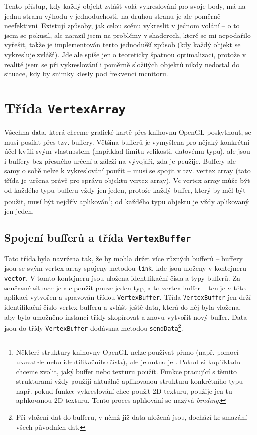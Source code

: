 \documentclass[a4paper, 11pt]{report}
\begin{document}
Tento přístup, kdy každý objekt zvlášť volá vykreslování pro svoje body, má na jednu stranu výhodu v jednoduchosti, na druhou stranu je ale poměrně neefektivní. Existují způsoby, jak celou scénu vykreslit v jednom volání -- o to jsem se pokusil, ale narazil jsem na problémy v shaderech, které se mi nepodařilo vyřešit, takže je implementován tento jednodušší způsob (kdy každý objekt se vykresluje zvlášť). Jde ale spíše jen o teoreticky špatnou optimalizaci, protože v realitě jsem se při vykreslování i poměrně složitých objektů nikdy nedostal do situace, kdy by snímky klesly pod frekvenci monitoru.

\section{Třída \texttt{VertexArray}}
Všechna data, která chceme grafické kartě přes knihovnu OpenGL poskytnout, se musí posílat přes tzv. buffery. Většina bufferů je vymyšlena pro nějaký konkrétní účel kvůli svým vlastnostem (například limitu velikosti, datovému typu), ale jsou i buffery bez přesného určení a záleží na vývojáři, zda je použije. Buffery ale samy o sobě nelze k vykreslování použít -- musí se spojit v tzv. vertex array (tato třída je určena právě pro správu objektu vertex array). Ve vertex array může být od každého typu bufferu vždy jen jeden, protože každý buffer, který by měl být použit, musí být nejdřív aplikován\footnote{Některé struktury knihovny OpenGL nelze používat přímo (např. pomocí ukazatele nebo identifikačního čísla), ale je nutno je . Pokud si kupříkladu chceme zvolit, jaký buffer nebo texturu použít. Funkce pracující s těmito strukturami vždy použijí aktuálně aplikovanou strukturu konkrétního typu -- např. pokud funkce vykreslování chce použít 2D texturu, použije jen tu aplikovanou 2D texturu. Tento proces aplikování se nazývá \emph{binding}.}; od každého typu objektu je vždy aplikovaný jen jeden.

\subsection{Spojení bufferů a třída \texttt{VertexBuffer}}
Tato třída byla navržena tak, že by mohla držet více různých bufferů -- buffery jsou se svým vertex array spojeny metodou \texttt{link}, kde jsou uloženy v kontejneru \texttt{vector}. V tomto kontejneru jsou uložena identifikační čísla a typy bufferů. Za současné situace je ale použit pouze jeden typ, a to vertex buffer -- ten je v této aplikaci vytvořen a spravován třídou \texttt{VertexBuffer}. Třída \texttt{VertexBuffer} jen drží identifikační číslo vertex bufferu a zvlášť ještě data, která do něj byla vložena, aby bylo umožněno instanci třídy zkopírovat a znovu vytvořit nový buffer. Data jsou do třídy \texttt{VertexBuffer} dodávána metodou \texttt{sendData}\footnote{Při vložení dat do bufferu, v němž již data uložená jsou, dochází ke smazání všech původních dat.}.
\end{document}
